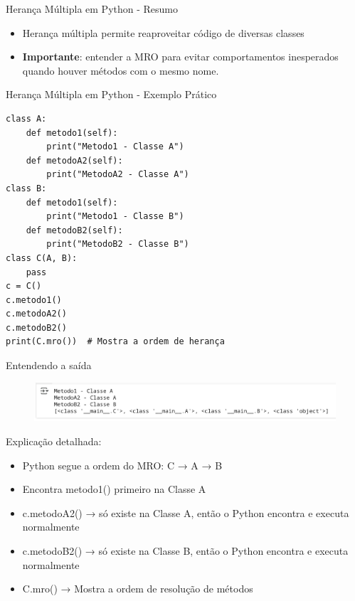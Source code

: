 \begin{frame}{Herança Múltipla em Python - Resumo}

    \begin{itemize}
        \item Herança múltipla permite reaproveitar código de diversas classes
        \item \textbf{Importante}: entender a MRO para evitar comportamentos inesperados quando houver métodos com o mesmo nome.
    \end{itemize}



\end{frame}




\begin{frame}[fragile]{Herança Múltipla em Python - Exemplo Prático}
    \small
    \begin{verbatim}
class A:
    def metodo1(self):
        print("Metodo1 - Classe A")  
    def metodoA2(self):
        print("MetodoA2 - Classe A")    
class B:
    def metodo1(self):
        print("Metodo1 - Classe B")
    def metodoB2(self):
        print("MetodoB2 - Classe B")    
class C(A, B):
    pass
c = C()
c.metodo1()
c.metodoA2()
c.metodoB2()
print(C.mro())  # Mostra a ordem de herança
\end{verbatim}
\end{frame}

\begin{frame}{Entendendo a saída}
    \begin{figure}
        \centering
        \includegraphics[width=0.9\linewidth]{Images/mro-saida-2.png}

    \end{figure}


    Explicação detalhada:
    \begin{itemize}
        \item Python segue a ordem do MRO: C → A → B
        \item        Encontra metodo1() primeiro na Classe A
        \item   c.metodoA2() → só existe na Classe A, então o  Python encontra e executa normalmente
        \item    c.metodoB2() → só existe na Classe B, então o  Python encontra e executa normalmente
        \item  C.mro() → Mostra a ordem de resolução de métodos
    \end{itemize}




\end{frame}


